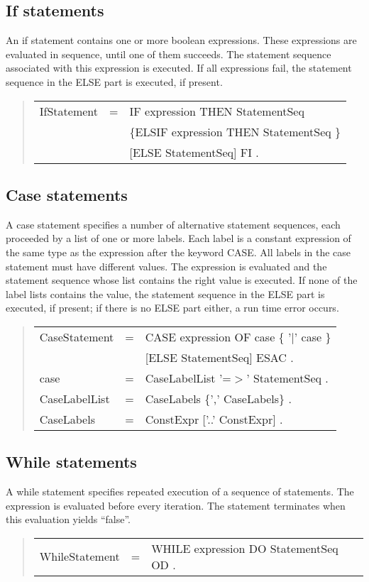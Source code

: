 \documentclass[10pt]{article}
\newenvironment{grammar}
{\begin{quote} \begin{tabular}{p{3.8cm} l l}}
{\end{tabular}\end{quote}}
\begin{document}
\subsection{If statements}

An if statement contains one or more boolean expressions.
These expressions are evaluated in sequence, until one of them succeeds.
The statement sequence associated with this expression is executed.
If all expressions fail, the statement sequence in the ELSE part is executed,
if present.
\begin{grammar}
IfStatement & = & IF expression THEN StatementSeq \\
& & \{ELSIF expression THEN StatementSeq \} \\
& & [ELSE StatementSeq] FI .
\end{grammar}
\subsection{Case statements}

A case statement specifies a number of alternative statement sequences,
each proceeded by a list of one or more labels.
Each label is a constant expression of the same type as the expression
after the keyword CASE.
All labels in the case statement must have different values.
The expression is evaluated and the statement sequence whose list contains
the right value is executed.
If none of the label lists contains the value, the statement sequence in
the ELSE part is executed, if present;
if there is no ELSE part either, a run time error occurs.
\begin{grammar}
CaseStatement & = & CASE expression OF case \{ '$|$' case \} \\
& & [ELSE StatementSeq] ESAC . \\
case & = & CaseLabelList '=$>$' StatementSeq . \\
CaseLabelList & = & CaseLabels \{',' CaseLabels\} . \\
CaseLabels & = & ConstExpr ['..' ConstExpr] .
\end{grammar}
\subsection{While statements}

A while statement specifies repeated execution of a sequence of
statements.
The expression is evaluated before every iteration.
The statement terminates when this evaluation yields ``false''.
\begin{grammar}
WhileStatement & = & WHILE expression DO StatementSeq OD .
\end{grammar}
\end{document}
